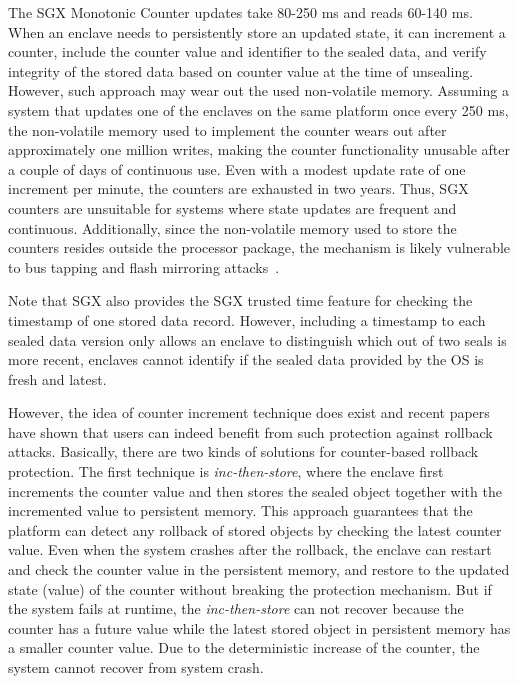 The SGX Monotonic Counter updates take 80-250 ms and reads 60-140 ms. When an enclave needs to persistently store an updated state, it can increment a counter, include the counter value and identifier to the sealed data, and verify integrity of the stored data based on counter value at the time of unsealing. However, such approach may wear out the used non-volatile memory. Assuming a system that updates one of the enclaves on the same platform once every 250 ms, the non-volatile memory used to implement the counter wears out after approximately one million writes, making the counter functionality unusable after a couple of days of continuous use. Even with a modest update rate of one increment per minute, the counters are exhausted in two years. Thus, SGX counters are unsuitable for systems where state updates are frequent and continuous. Additionally, since the non-volatile memory used to store the counters resides outside the processor package, the mechanism is likely vulnerable to bus tapping and flash mirroring attacks~\cite{skorobogatov2016bumpy}.

Note that SGX also provides the SGX trusted time feature for checking the timestamp of one stored data record. However, including a timestamp to each sealed data version only allows an enclave to distinguish which out of two seals is more recent, enclaves cannot identify if the sealed data provided by the OS is fresh and latest.

However, the idea of counter increment technique does exist and recent papers~\cite{bailleu2019speicher, enclavedb:sp18, matetic2017rote} have 
shown that users can indeed benefit from such protection against rollback attacks.
Basically, there are two kinds of solutions for counter-based rollback protection.
The first technique is \textit{inc-then-store}, where the enclave first increments the counter
value and then stores the sealed object together with the incremented value 
to persistent memory. This approach guarantees that the platform can detect any rollback 
of stored objects by checking the latest counter value. Even when the system crashes after 
the rollback, the enclave can restart and check the counter value in the persistent memory,
and restore to the updated state (value) of the counter without breaking the protection mechanism.
But if the system fails at runtime, the \textit{inc-then-store} can not recover because 
the counter has a future value while the latest stored object in persistent memory has a smaller 
counter value. Due to the deterministic increase of the counter, the system cannot recover from 
system crash.

